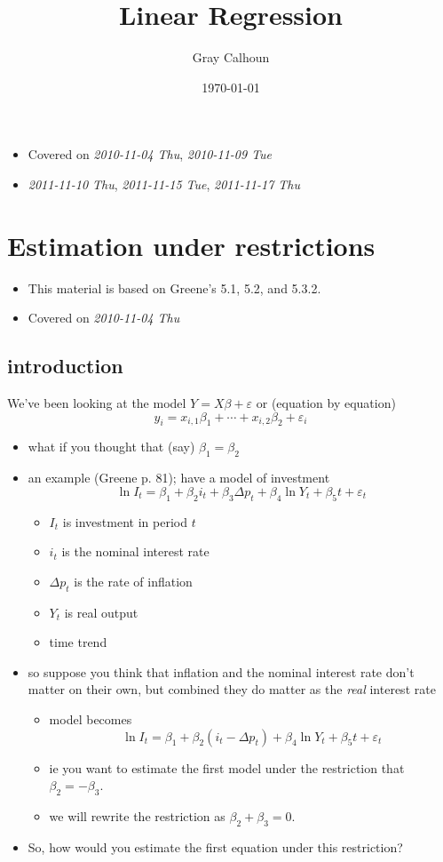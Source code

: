 \documentclass[11pt]{article}
\title{Linear Regression}
\author{Gray Calhoun}
\date{\today}
\begin{document}
\maketitle

\setcounter{tocdepth}{2}
\tableofcontents
\vspace*{1cm}
\begin{itemize}
\item Covered on \textit{2010-11-04 Thu}, \textit{2010-11-09 Tue}
\item \textit{2011-11-10 Thu}, \textit{2011-11-15 Tue}, \textit{2011-11-17 Thu}
\end{itemize}
\section{Estimation under restrictions}
\label{sec-1}

\begin{itemize}
\item This material is based on Greene's 5.1, 5.2, and 5.3.2.
\item Covered on \textit{2010-11-04 Thu}
\end{itemize}
\subsection{introduction}
\label{sec-1-1}

    We've been looking at the model $Y = X\beta + \varepsilon$ or
    (equation by equation) \[ y_i = x_{i,1} \beta_1 + \cdots +
    x_{i,2} \beta_2 + \varepsilon_i \]
\begin{itemize}
\item what if you thought that (say) $\beta_1 = \beta_2$
\item an example (Greene p. 81); have a model of investment \[ \ln I_t
      = \beta_1 + \beta_2 i_t + \beta_3 \Delta p_t + \beta_4 \ln Y_t +
      \beta_5 t + \varepsilon_t \]
\begin{itemize}
\item $I_t$ is investment in period $t$
\item $i_t$ is the nominal interest rate
\item $\Delta p_t$ is the rate of inflation
\item $Y_t$ is real output
\item time trend
\end{itemize}
\item so suppose you think that inflation and the nominal interest rate
      don't matter on their own, but combined they do matter as the
      \emph{real} interest rate
\begin{itemize}
\item model becomes
        \[ \ln I_t = \beta_1 + \beta_2 (i_t - \Delta p_t) + \beta_4 \ln
        Y_t + \beta_5 t + \varepsilon_t \]
\item ie you want to estimate the first model under the restriction
        that $\beta_2 = - \beta_3$.
\item we will rewrite the restriction as $\beta_2 + \beta_3 = 0$.
\end{itemize}
\item So, how would you estimate the first equation under this
      restriction?
\end{itemize}
\end{document}
